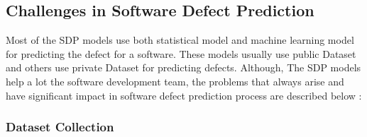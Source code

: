 \documentclass[12pt]{report}
\begin{document}
%
%
%
%
%

\subsection{Challenges in Software Defect Prediction}

Most of the SDP models use both statistical model and machine learning model for predicting the defect for a software. These models usually use public Dataset and others use private Dataset for predicting defects. Although, The SDP models help a lot the software development team, the problems that always arise and have significant impact in software defect prediction process are described below :


\subsubsection{Dataset Collection}
\end{document}
